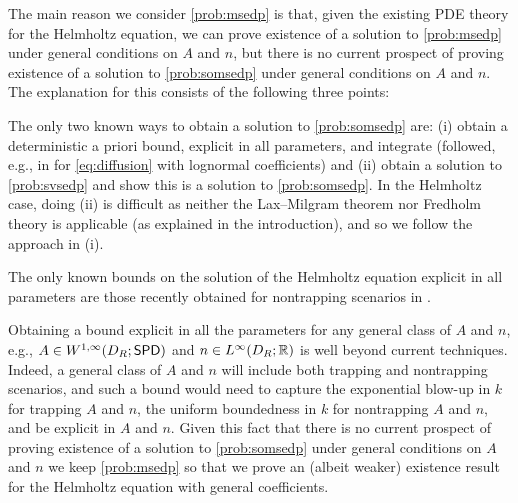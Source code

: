 The main reason we consider \cref{prob:msedp} is that, given the existing PDE theory for the Helmholtz equation, we can prove existence of a solution to \cref{prob:msedp} under general conditions on $A$ and $n$, but there is no current prospect of proving existence of a solution to \cref{prob:somsedp} under general conditions on $A$ and $n$. The explanation for this consists of the following three points:
\ben
\item The only two known ways to obtain a solution to \cref{prob:somsedp} are: (i) obtain a deterministic a priori bound, explicit in all parameters, and integrate (followed, e.g., in \cite{ChScTe:13} for \eqref{eq:diffusion} with lognormal coefficients) and (ii) obtain a solution to \cref{prob:svsedp} and show this is a solution to \cref{prob:somsedp}. In the Helmholtz case, doing (ii) is difficult as neither the Lax--Milgram theorem nor Fredholm theory is applicable (as explained in the introduction), and so we follow the approach in (i).
\item The only known bounds on the solution of the Helmholtz equation explicit in all parameters are those recently obtained for nontrapping scenarios in \cite{GrPeSp:19,GaSpWu:18}.
\item Obtaining a bound explicit in all the parameters for any general class of $A$ and $n$, e.g., $A \in \WoiDRspd$ and $n \in \LiDRRR$ is well beyond current techniques. Indeed, a general class of $A$ and $n$ will include both trapping and nontrapping scenarios, and such a bound would need to capture the exponential blow-up in $k$ for trapping $A$ and $n$, the uniform boundedness in $k$ for nontrapping $A$ and $n$, and be explicit in $A$ and $n$.
\een
Given this fact that there is no current prospect of proving existence of a solution to \cref{prob:somsedp} under general conditions on $A$ and $n$ we keep \cref{prob:msedp} so that we prove an (albeit weaker) existence result for the Helmholtz equation with general coefficients.


